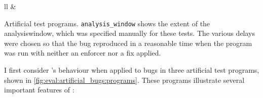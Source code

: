 \begin{sanefig}
\begin{tabular}{ll}
{{      }
      \label{fig:eval:artificial_bugs:programs:double_free:active}
    }
    &
  \end{tabular}
  \caption{Artificial test programs.  \texttt{analysis\_window} shows
    the extent of the \gls{analysiswindow}, which was specified
    manually for these tests.  The various delays were chosen so that
    the bug reproduced in a reasonable time when the program was run
    with neither an enforcer nor a fix applied.}
  \label{fig:eval:artificial_bugs:programs}
\end{sanefig}

I first consider {\technique}'s behaviour when applied to bugs in
three artificial test programs, shown in
\autoref{fig:eval:artificial_bugs:programs}.  These programs
illustrate several important features of {\technique}:

